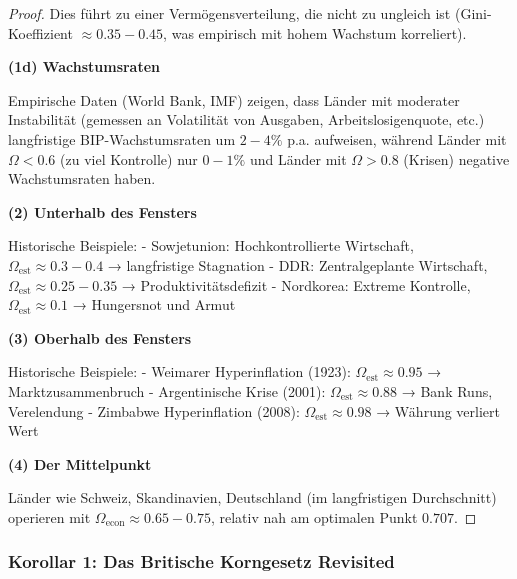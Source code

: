 \documentclass[a4paper, 12pt, twoside, openright]{report}
\theoremstyle{definition}
\theoremstyle{definition}
\begin{document}
\begin{proof}
Dies führt zu einer Vermögensverteilung, die nicht zu ungleich ist (Gini-Koeffizient $\approx 0.35-0.45$, was empirisch mit hohem Wachstum korreliert).

\textbf{(1d) Wachstumsraten}

Empirische Daten (World Bank, IMF) zeigen, dass Länder mit moderater Instabilität (gemessen an Volatilität von Ausgaben, Arbeitslosigenquote, etc.) langfristige BIP-Wachstumsraten um $2-4\%$ p.a. aufweisen, während Länder mit $\Omega < 0.6$ (zu viel Kontrolle) nur $0-1\%$ und Länder mit $\Omega > 0.8$ (Krisen) negative Wachstumsraten haben.

\textbf{(2) Unterhalb des Fensters}

Historische Beispiele:
- Sowjetunion: Hochkontrollierte Wirtschaft, $\Omega_{\text{est}} \approx 0.3-0.4$ → langfristige Stagnation
- DDR: Zentralgeplante Wirtschaft, $\Omega_{\text{est}} \approx 0.25-0.35$ → Produktivitätsdefizit
- Nordkorea: Extreme Kontrolle, $\Omega_{\text{est}} \approx 0.1$ → Hungersnot und Armut

\textbf{(3) Oberhalb des Fensters}

Historische Beispiele:
- Weimarer Hyperinflation (1923): $\Omega_{\text{est}} \approx 0.95$ → Marktzusammenbruch
- Argentinische Krise (2001): $\Omega_{\text{est}} \approx 0.88$ → Bank Runs, Verelendung
- Zimbabwe Hyperinflation (2008): $\Omega_{\text{est}} \approx 0.98$ → Währung verliert Wert

\textbf{(4) Der Mittelpunkt}

Länder wie Schweiz, Skandinavien, Deutschland (im langfristigen Durchschnitt) operieren mit $\Omega_{\text{econ}} \approx 0.65-0.75$, relativ nah am optimalen Punkt $0.707$.

\end{proof}

\subsubsection{Korollar 1: Das Britische Korngesetz Revisited}
\end{document}
